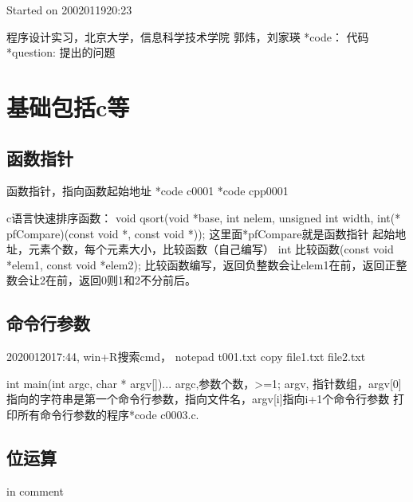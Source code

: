 \documentclass[UTF8]{article}
\begin{document}
Started on 2002011920:23

程序设计实习，北京大学，信息科学技术学院
郭炜，刘家瑛
*code： 代码
*question: 提出的问题


\section{基础包括c等}
\subsection{函数指针}
函数指针，指向函数起始地址
*code c0001
*code cpp0001

c语言快速排序函数：
void qsort(void *base, int nelem, unsigned int width, int(* pfCompare)(const void *, const void *));
这里面*pfCompare就是函数指针
起始地址，元素个数，每个元素大小，比较函数（自己编写）
int 比较函数(const void *elem1, const void *elem2);
比较函数编写，返回负整数会让elem1在前，返回正整数会让2在前，返回0则1和2不分前后。

\subsection{命令行参数}
2020012017:44,
win+R搜索cmd，
notepad t001.txt
copy file1.txt file2.txt

int main(int argc, char * argv[]){...}
argc,参数个数，>=1;
argv, 指针数组，argv[0]指向的字符串是第一个命令行参数，指向文件名，argv[i]指向i+1个命令行参数
打印所有命令行参数的程序*code c0003.c.

\subsection{位运算}
in comment
\begin{comment}
与&，双目,2个1才是1
21 & 18 = 16
某位清0，或提取变量某一位。
如将int低8位清0:
n = n & 0xffffff00;
n &= 0xffffff00;
对于short的n是 n &= 0xff00;
*question: 判断int右起从0开始第7位是否是1？
看n & 0x80 是不是0x80即可。
0x80 = 1000 0000 。


或|，双目,2个0才是0
21 | 18 = 23
某些位置1，保留其余不变，
如低8位变成1其余不变，
n |= 0xffffffea



非~，单目,
~21 = 0xff



异或^，双目, 不同时取1.
21 ^ 18 = 7
某些位取反，其余不变。
n ^= 0xff
1 1 0
0 0 0
1 0 1
0 1 1
发现 a^b=c,能得到b^c=a, c^a=b, 可用于加密解密，如用秘钥b加密a。
a b --c | a b -a
b c --a | b a -b
c a --b | a b -a
如以下可实现2个变量直接交换：
a ^= b;
b ^= a;
a ^= b;


<<左移，双目
a<<b = a*2^b
a左移b位，高位丢弃，低位补0


>>右移，双目
有符号位如long, int, short, char, 右移后左边补的数和符号位相同。
无符号的补0
往小取整
-25 >> 4 = -2
-2 >> 4 = -1
18 >> 4 = 1
*code c0004

*question: 2个int的a和n=[0,31],取a的第n位。
(a>>n) & 0x0001;
(a>>n) & 1;
或者： (a & (1<<n))>> n
\end{comment}
\end{document}
